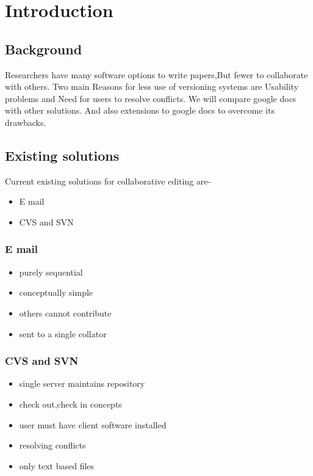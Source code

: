 \section{Introduction}

\subsection{Background} 
Researchers have many software options to write papers,But fewer to collaborate with others.
Two main Reasons for less use of versioning systems are Usability problems and Need for users to resolve conflicts.
We will compare google docs with other solutions. And also extensions to google docs to overcome its drawbacks.

\subsection{Existing solutions}
Current existing solutions for collaborative editing are-
\begin{itemize}
 \item E mail
 \item CVS and SVN

 \end{itemize}
 
 \subsubsection{E mail}
 \begin{itemize}
  \item  purely sequential
 \item  conceptually simple
 \item  others cannot contribute
 \item  sent to a single collator
 \end{itemize}
 
 \subsubsection{CVS and SVN}
 \begin{itemize}
 \item single server maintains repository
\item check out,check in concepts
\item user must have client software installed
\item resolving conflicts
\item only text based files
 \end{itemize}
 
